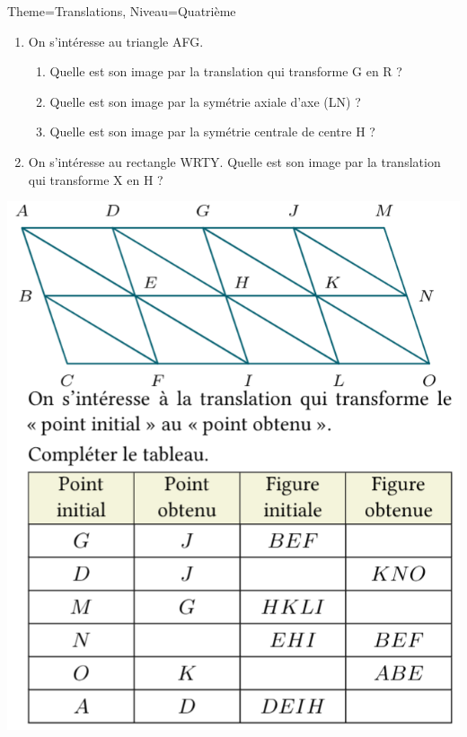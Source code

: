 \documentclass[11pt]{article}
\begin{document}
\begin{Maquette}[Fiche]{Theme=Translations, Niveau=Quatrième}
\begin{multicols}{2}
\begin{exercice}
    \begin{enumerate}
        \item On s’intéresse au triangle AFG.
        \begin{enumerate}[label=\textbf{\alph*.}]
            \item Quelle est son image par la translation qui transforme G en R ?
            \item Quelle est son image par la symétrie axiale d’axe (LN) ?
            \item Quelle est son image par la symétrie centrale de centre H ?
        \end{enumerate}
        \item On s’intéresse au rectangle WRTY. Quelle est son image par la translation qui transforme X en H ?
    \end{enumerate}
\end{exercice}

\begin{exercice}
    \includegraphics[width=\linewidth]{Images/exercice6.png}
\end{exercice}

\end{multicols}

\end{Maquette}
\end{document}
